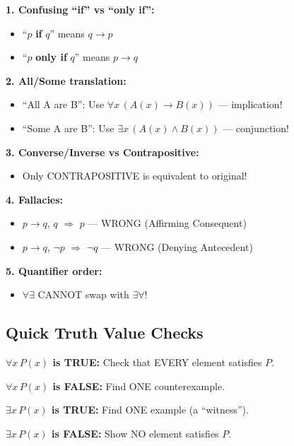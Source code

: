 \documentclass[11pt,a4paper]{article}
\begin{document}
\begin{warningbox}
\textbf{1. Confusing ``if'' vs ``only if'':}
\begin{itemize}[noitemsep]
    \item ``$p$ \textbf{if} $q$'' means $q \to p$
    \item ``$p$ \textbf{only if} $q$'' means $p \to q$
\end{itemize}

\textbf{2. All/Some translation:}
\begin{itemize}[noitemsep]
    \item ``All A are B'': Use $\forall x\,(A(x) \to B(x))$ --- implication!
    \item ``Some A are B'': Use $\exists x\,(A(x) \land B(x))$ --- conjunction!
\end{itemize}

\textbf{3. Converse/Inverse vs Contrapositive:}
\begin{itemize}[noitemsep]
    \item Only CONTRAPOSITIVE is equivalent to original!
\end{itemize}

\textbf{4. Fallacies:}
\begin{itemize}[noitemsep]
    \item $p \to q$, $q$ $\Rightarrow$ $p$ --- WRONG (Affirming Consequent)
    \item $p \to q$, $\neg p$ $\Rightarrow$ $\neg q$ --- WRONG (Denying Antecedent)
\end{itemize}

\textbf{5. Quantifier order:}
\begin{itemize}[noitemsep]
    \item $\forall \exists$ CANNOT swap with $\exists \forall$!
\end{itemize}
\end{warningbox}

\subsection{Quick Truth Value Checks}

\begin{tipbox}
\textbf{$\forall x\, P(x)$ is TRUE:} Check that EVERY element satisfies $P$.

\textbf{$\forall x\, P(x)$ is FALSE:} Find ONE counterexample.

\textbf{$\exists x\, P(x)$ is TRUE:} Find ONE example (a ``witness'').

\textbf{$\exists x\, P(x)$ is FALSE:} Show NO element satisfies $P$.
\end{tipbox}
\end{document}
